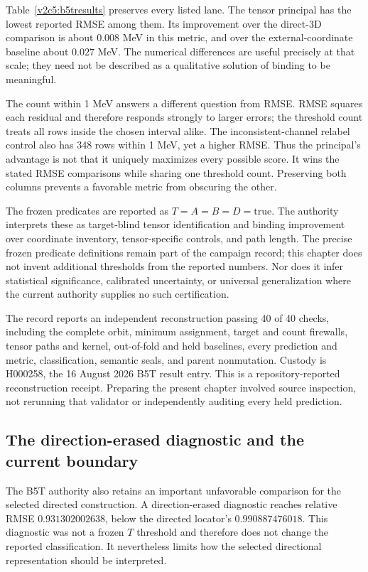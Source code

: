 Table~\ref{v2c5:b5tresults} preserves every listed lane. The tensor principal has the lowest reported RMSE among them. Its improvement over the direct-3D comparison is about $0.008$ MeV in this metric, and over the external-coordinate baseline about $0.027$ MeV. The numerical differences are useful precisely at that scale; they need not be described as a qualitative solution of binding to be meaningful.

The count within 1 MeV answers a different question from RMSE. RMSE squares each residual and therefore responds strongly to larger errors; the threshold count treats all rows inside the chosen interval alike. The inconsistent-channel relabel control also has 348 rows within 1 MeV, yet a higher RMSE. Thus the principal's advantage is not that it uniquely maximizes every possible score. It wins the stated RMSE comparisons while sharing one threshold count. Preserving both columns prevents a favorable metric from obscuring the other.

The frozen predicates are reported as $T=A=B=D=\mathrm{true}$. The authority interprets these as target-blind tensor identification and binding improvement over coordinate inventory, tensor-specific controls, and path length. The precise frozen predicate definitions remain part of the campaign record; this chapter does not invent additional thresholds from the reported numbers. Nor does it infer statistical significance, calibrated uncertainty, or universal generalization where the current authority supplies no such certification.

The record reports an independent reconstruction passing 40 of 40 checks, including the complete orbit, minimum assignment, target and count firewalls, tensor paths and kernel, out-of-fold and held baselines, every prediction and metric, classification, semantic seals, and parent nonmutation. Custody is H000258, the 16 August 2026 B5T result entry. This is a repository-reported reconstruction receipt. Preparing the present chapter involved source inspection, not rerunning that validator or independently auditing every held prediction.\cite{viibinding}

\subsection{The direction-erased diagnostic and the current boundary}
\label{v2c5:diagnostic}

The B5T authority also retains an important unfavorable comparison for the selected directed construction. A direction-erased diagnostic reaches relative RMSE $0.931302002638$, below the directed locator's $0.990887476018$. This diagnostic was not a frozen $T$ threshold and therefore does not change the reported classification. It nevertheless limits how the selected directional representation should be interpreted.

